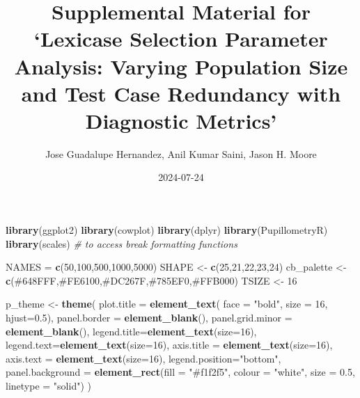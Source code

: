 \documentclass[
]{book}
\title{Supplemental Material for `Lexicase Selection Parameter Analysis: Varying Population Size and Test Case Redundancy with Diagnostic Metrics'}
\author{Jose Guadalupe Hernandez, Anil Kumar Saini, Jason H. Moore}
\date{2024-07-24}
\newenvironment{Shaded}{\begin{snugshade}}{\end{snugshade}}
\newcommand{\AttributeTok}[1]{\textcolor[rgb]{0.13,0.29,0.53}{#1}}
\newcommand{\CommentTok}[1]{\textcolor[rgb]{0.56,0.35,0.01}{\textit{#1}}}
\newcommand{\DecValTok}[1]{\textcolor[rgb]{0.00,0.00,0.81}{#1}}
\newcommand{\FloatTok}[1]{\textcolor[rgb]{0.00,0.00,0.81}{#1}}
\newcommand{\FunctionTok}[1]{\textcolor[rgb]{0.13,0.29,0.53}{\textbf{#1}}}
\newcommand{\NormalTok}[1]{#1}
\newcommand{\OtherTok}[1]{\textcolor[rgb]{0.56,0.35,0.01}{#1}}
\newcommand{\StringTok}[1]{\textcolor[rgb]{0.31,0.60,0.02}{#1}}
\begin{document}
\maketitle

{
\setcounter{tocdepth}{1}
\tableofcontents
}
\begin{Shaded}
\begin{Highlighting}[]
\FunctionTok{library}\NormalTok{(ggplot2)}
\FunctionTok{library}\NormalTok{(cowplot)}
\FunctionTok{library}\NormalTok{(dplyr)}
\FunctionTok{library}\NormalTok{(PupillometryR)}
\FunctionTok{library}\NormalTok{(scales) }\CommentTok{\# to access break formatting functions}


\NormalTok{NAMES }\OtherTok{=} \FunctionTok{c}\NormalTok{(}\DecValTok{50}\NormalTok{,}\DecValTok{100}\NormalTok{,}\DecValTok{500}\NormalTok{,}\DecValTok{1000}\NormalTok{,}\DecValTok{5000}\NormalTok{)}
\NormalTok{SHAPE }\OtherTok{\textless{}{-}} \FunctionTok{c}\NormalTok{(}\DecValTok{25}\NormalTok{,}\DecValTok{21}\NormalTok{,}\DecValTok{22}\NormalTok{,}\DecValTok{23}\NormalTok{,}\DecValTok{24}\NormalTok{)}
\NormalTok{cb\_palette }\OtherTok{\textless{}{-}} \FunctionTok{c}\NormalTok{(}\StringTok{\textquotesingle{}\#648FFF\textquotesingle{}}\NormalTok{,}\StringTok{\textquotesingle{}\#FE6100\textquotesingle{}}\NormalTok{,}\StringTok{\textquotesingle{}\#DC267F\textquotesingle{}}\NormalTok{,}\StringTok{\textquotesingle{}\#785EF0\textquotesingle{}}\NormalTok{,}\StringTok{\textquotesingle{}\#FFB000\textquotesingle{}}\NormalTok{)}
\NormalTok{TSIZE }\OtherTok{\textless{}{-}} \DecValTok{16}

\NormalTok{p\_theme }\OtherTok{\textless{}{-}} \FunctionTok{theme}\NormalTok{(}
  \AttributeTok{plot.title =} \FunctionTok{element\_text}\NormalTok{( }\AttributeTok{face =} \StringTok{"bold"}\NormalTok{, }\AttributeTok{size =} \DecValTok{16}\NormalTok{, }\AttributeTok{hjust=}\FloatTok{0.5}\NormalTok{),}
  \AttributeTok{panel.border =} \FunctionTok{element\_blank}\NormalTok{(),}
  \AttributeTok{panel.grid.minor =} \FunctionTok{element\_blank}\NormalTok{(),}
  \AttributeTok{legend.title=}\FunctionTok{element\_text}\NormalTok{(}\AttributeTok{size=}\DecValTok{16}\NormalTok{),}
  \AttributeTok{legend.text=}\FunctionTok{element\_text}\NormalTok{(}\AttributeTok{size=}\DecValTok{16}\NormalTok{),}
  \AttributeTok{axis.title =} \FunctionTok{element\_text}\NormalTok{(}\AttributeTok{size=}\DecValTok{16}\NormalTok{),}
  \AttributeTok{axis.text =} \FunctionTok{element\_text}\NormalTok{(}\AttributeTok{size=}\DecValTok{16}\NormalTok{),}
  \AttributeTok{legend.position=}\StringTok{"bottom"}\NormalTok{,}
  \AttributeTok{panel.background =} \FunctionTok{element\_rect}\NormalTok{(}\AttributeTok{fill =} \StringTok{"\#f1f2f5"}\NormalTok{,}
                                  \AttributeTok{colour =} \StringTok{"white"}\NormalTok{,}
                                  \AttributeTok{size =} \FloatTok{0.5}\NormalTok{, }\AttributeTok{linetype =} \StringTok{"solid"}\NormalTok{)}
\NormalTok{)}
\end{Highlighting}
\end{Shaded}
\end{document}
